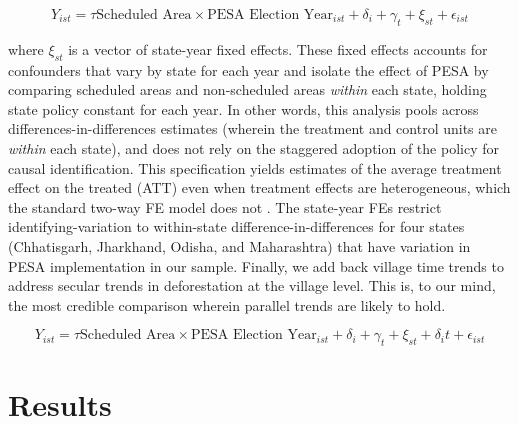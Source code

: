 \documentclass[12pt,reqno]{article}
\begin{document}
\begin{equation}\label{styfe}
Y_{ist} = \tau \text{Scheduled Area} \times \text{PESA Election Year}_{ist} +
\delta_i + \gamma_t + \xi_{st} + \epsilon_{ist}
\end{equation}

where $\xi_{st}$ is a vector of state-year fixed effects. These fixed effects accounts for confounders that vary by state for each year and isolate the effect of PESA by comparing scheduled areas and non-scheduled areas \emph{within} each state, holding state policy constant for each year. In other words, this analysis pools across differences-in-differences estimates (wherein the treatment and control units are \emph{within} each state), and does not rely on the staggered adoption of the policy for causal identification. This specification yields estimates of the average treatment effect on the treated (ATT) even when treatment effects are heterogeneous, which the standard two-way FE model does not \parencite{Imai2019-kp}.
The state-year FEs restrict identifying-variation to within-state difference-in-differences for four states (Chhatisgarh, Jharkhand, Odisha, and Maharashtra) that have variation in PESA implementation in our sample. Finally, we add back village time trends to address secular trends in deforestation at the village level. This is, to our mind, the most credible comparison wherein parallel trends are likely to hold.

\begin{equation}\label{styfett}
Y_{ist} = \tau \text{Scheduled Area} \times \text{PESA Election Year}_{ist} +
\delta_i + \gamma_t + \xi_{st} + \delta_i t + \epsilon_{ist}
\end{equation}



\section{Results}\label{sec:Results} %
\end{document}
